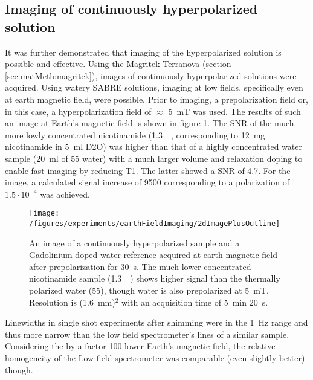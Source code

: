     \subsection{Imaging of continuously hyperpolarized solution}
    It was further demonstrated that imaging of the hyperpolarized solution is possible and effective.
    Using the Magritek Terranova (section \ref{sec:matMeth:magritek}), images of continuously hyperpolarized solutions were acquired. Using watery SABRE solutions, imaging at low fields, specifically even at earth magnetic field, were possible. Prior to imaging, a prepolarization field or, in this case, a hyperpolarization field of $\approx$ \SI{5}{\milli\tesla} was used. The results of such an image at Earth's magnetic field is shown in figure \ref{fig:results:earthFieldImage}.  The SNR of the much more lowly concentrated nicotinamide (\SI{1.3}{\milli\Molar}, corresponding to \SI{12}{\milli\gram} nicotinamide in \SI{5}{\milli\litre} D2O) was higher than that of a highly concentrated water sample (\SI{20}{\milli\litre} of \SI{55}{\Molar} water) with a much larger volume and relaxation doping to enable fast imaging by reducing T1. The latter showed a SNR of 4.7. For the image, a calculated signal increase of 9500 corresponding to a polarization of $1.5\cdot 10^{-4}$ was achieved.
    \begin{figure}
            \texttt{[image: /figures/experiments/earthFieldImaging/2dImagePlusOutline]}
            \caption[Earth field SABRE image]{An image of a continuously hyperpolarized sample and a Gadolinium doped water reference acquired at earth magnetic field after prepolarization for \SI{30}{\second}. The much lower concentrated nicotinamide sample (\SI{1.3}{\milli\Molar}) shows higher signal than the thermally polarized water (\SI{55}{\Molar}), though water is also prepolarized at \SI{5}{\milli\tesla}. Resolution is (\SI{1.6}{\milli\meter})$^2$ with an acquisition time of \SI{5}{\minute} \SI{20}{\second}.}
            \label{fig:results:earthFieldImage}
        \end{figure}
        Linewidths in single shot experiments after shimming were in the \SI{1}{\hertz} range and thus more narrow than the low field spectrometer's lines of a similar sample. Considering the by a factor 100 lower Earth's magnetic field, the relative homogeneity of the Low field spectrometer was comparable (even slightly better) though.
